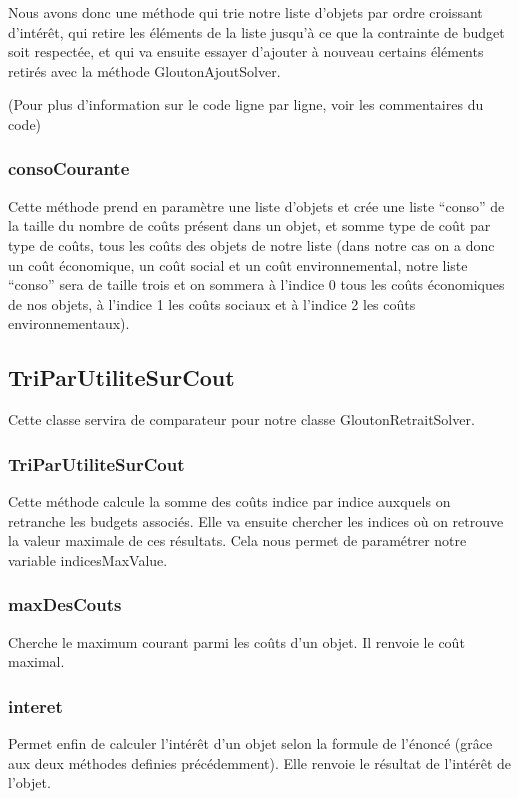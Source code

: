 \documentclass[11pt]{article}
\begin{document}
Nous avons donc une méthode qui trie notre liste d’objets par ordre croissant d'intérêt, qui retire les éléments de la liste jusqu’à ce que la contrainte de budget soit respectée, et qui va ensuite essayer d’ajouter à nouveau certains éléments retirés avec la méthode GloutonAjoutSolver. 

(Pour plus d’information sur le code ligne par ligne, voir les commentaires du code)

\subsubsection{consoCourante}
Cette méthode prend en paramètre une liste d’objets et crée une liste “conso” de la taille du nombre de coûts présent dans un objet, et somme type de coût par type de coûts, tous les coûts des objets de notre liste (dans notre cas on a donc un coût économique, un coût social et un coût environnemental, notre liste “conso” sera de taille trois et on sommera à l’indice 0 tous les coûts économiques de nos objets, à l'indice 1 les coûts sociaux et à l'indice 2 les coûts environnementaux). 

\subsection{TriParUtiliteSurCout}
Cette classe servira de comparateur pour notre classe GloutonRetraitSolver.

\subsubsection{TriParUtiliteSurCout}
Cette méthode calcule la somme des coûts indice par indice auxquels on retranche les budgets associés. Elle va ensuite chercher les indices où on retrouve la valeur maximale de ces résultats. Cela nous permet de paramétrer notre variable indicesMaxValue.

\subsubsection{maxDesCouts}
Cherche le maximum courant parmi les coûts d’un objet. Il renvoie le coût maximal. 

\subsubsection{interet}
Permet enfin de calculer l'intérêt d’un objet selon la formule de l’énoncé (grâce aux deux méthodes definies précédemment). Elle renvoie le résultat de l'intérêt de l’objet.
\end{document}
